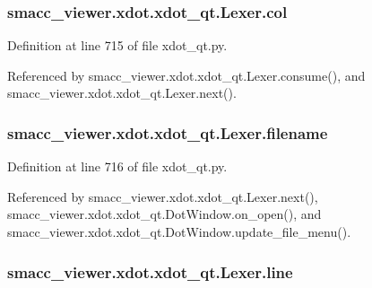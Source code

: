 \subsubsection[{\texorpdfstring{col}{col}}]{\setlength{\rightskip}{0pt plus 5cm}smacc\+\_\+viewer.\+xdot.\+xdot\+\_\+qt.\+Lexer.\+col}\hypertarget{classsmacc__viewer_1_1xdot_1_1xdot__qt_1_1Lexer_af2614106d71cab740cc0e1e1e6e349c0}{}\label{classsmacc__viewer_1_1xdot_1_1xdot__qt_1_1Lexer_af2614106d71cab740cc0e1e1e6e349c0}


Definition at line 715 of file xdot\+\_\+qt.\+py.



Referenced by smacc\+\_\+viewer.\+xdot.\+xdot\+\_\+qt.\+Lexer.\+consume(), and smacc\+\_\+viewer.\+xdot.\+xdot\+\_\+qt.\+Lexer.\+next().

\subsubsection[{\texorpdfstring{filename}{filename}}]{\setlength{\rightskip}{0pt plus 5cm}smacc\+\_\+viewer.\+xdot.\+xdot\+\_\+qt.\+Lexer.\+filename}\hypertarget{classsmacc__viewer_1_1xdot_1_1xdot__qt_1_1Lexer_a568d66f9f2bcbf00150f2ad4889295da}{}\label{classsmacc__viewer_1_1xdot_1_1xdot__qt_1_1Lexer_a568d66f9f2bcbf00150f2ad4889295da}


Definition at line 716 of file xdot\+\_\+qt.\+py.



Referenced by smacc\+\_\+viewer.\+xdot.\+xdot\+\_\+qt.\+Lexer.\+next(), smacc\+\_\+viewer.\+xdot.\+xdot\+\_\+qt.\+Dot\+Window.\+on\+\_\+open(), and smacc\+\_\+viewer.\+xdot.\+xdot\+\_\+qt.\+Dot\+Window.\+update\+\_\+file\+\_\+menu().

\subsubsection[{\texorpdfstring{line}{line}}]{\setlength{\rightskip}{0pt plus 5cm}smacc\+\_\+viewer.\+xdot.\+xdot\+\_\+qt.\+Lexer.\+line}\hypertarget{classsmacc__viewer_1_1xdot_1_1xdot__qt_1_1Lexer_a52906deed94ab0734201e50faf6f3c7f}{}\label{classsmacc__viewer_1_1xdot_1_1xdot__qt_1_1Lexer_a52906deed94ab0734201e50faf6f3c7f}


